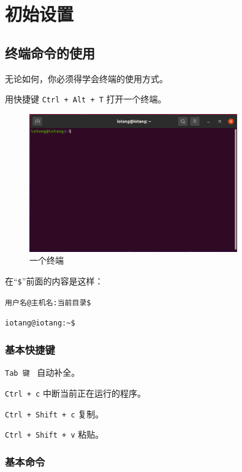 \documentclass[UTF-8]{ctexart}
\begin{document}
	\section{初始设置}
	
		\subsection{终端命令的使用}
		
			无论如何，你必须得学会终端的使用方式。
		
			用快捷键 \texttt{Ctrl + Alt + T} 打开一个终端。
			
			\begin{figure}[H]
				\centering
				\includegraphics[width=0.8\textwidth]{fig/terminal.png}
				\caption*{一个终端}
			\end{figure}
		
			在“\texttt{\$}”前面的内容是这样：
			
			\texttt{\huge {\color{red}用户名}{\color{brown}@}{\color{olive}主机名}{\color{cyan}:}{\color{blue}当前目录}\$}
			
			\texttt{\huge {\color{red}iotang}{\color{brown}@}{\color{olive}iotang}{\color{cyan}:}{\color{blue}\textasciitilde}\$}
		
			\subsubsection{基本快捷键}
			
				\texttt{Tab 键} ~自动补全。
				
				\texttt{Ctrl + c} 中断当前正在运行的程序。
				
				\texttt{Ctrl + Shift + c} 复制。
				
				\texttt{Ctrl + Shift + v} 粘贴。
			
			\subsubsection{基本命令}
			
\end{document}
